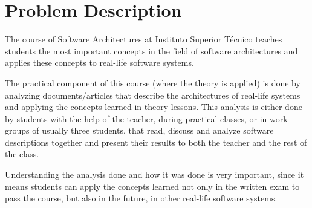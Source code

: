 
\chapter{Problem Description}
\label{chapter:problemdescription}
The course of Software Architectures at Instituto Superior T\'{e}cnico teaches students the most important concepts in the field of software architectures and applies these concepts to real-life software systems.

The practical component of this course (where the theory is applied) is done by analyzing documents/articles that describe the architectures of real-life systems and applying the concepts learned in theory lessons.
This analysis is either done by students with the help of the teacher, during practical classes, or in work groups of usually three students, that read, discuss and analyze software descriptions together and present their results to both the teacher and the rest of the class.

Understanding the analysis done and how it was done is very important, since it means students can apply the concepts learned not only in the written exam to pass the course, but also in the future, in other real-life software systems.

